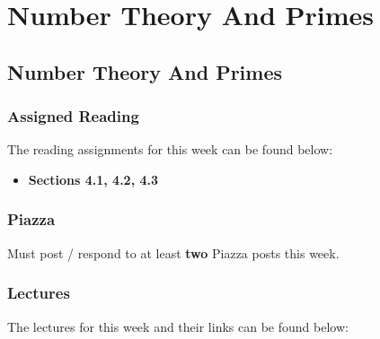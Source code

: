 \clearpage

\renewcommand{\ChapTitle}{Number Theory And Primes}
\renewcommand{\SectionTitle}{Number Theory And Primes}

\chapter{\ChapTitle}
\section{\SectionTitle}

\subsection{Assigned Reading}

The reading assignments for this week can be found below:

\begin{itemize}
    \item \textbf{Sections 4.1, 4.2, 4.3}
\end{itemize}

\subsection{Piazza}

Must post / respond to at least \textbf{two} Piazza posts this week.  

\subsection{Lectures}

The lectures for this week and their links can be found below:


